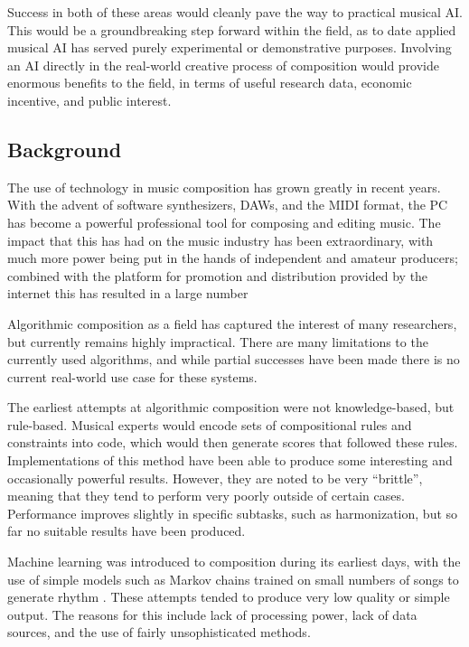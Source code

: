 \documentclass[11pt]{article}
\begin{document}
	Success in both of these areas would cleanly pave the way to practical musical AI. This would be a groundbreaking step forward within the field, as to date applied musical AI has served purely experimental or demonstrative purposes. Involving an AI directly in the real-world creative process of composition would provide enormous benefits to the field, in terms of useful research data, economic incentive, and public interest.
	
	\subsection{Background}
	
	The use of technology in music composition has grown greatly in recent years. With the advent of software synthesizers, DAWs, and the MIDI format, the PC has become a powerful professional tool for composing and editing music. The impact that this has had on the music industry has been extraordinary, with much more power being put in the hands of independent and amateur producers; combined with the platform for promotion and distribution provided by the internet this has resulted in a large number 
	
	
	Algorithmic composition as a field has captured the interest of many researchers, but currently remains highly impractical. There are many limitations to the currently used algorithms, and while partial successes have been made %
	there is no current real-world use case for these systems. 
	
	The earliest attempts at algorithmic composition were not knowledge-based, but rule-based. Musical experts would encode sets of compositional rules and constraints into code, which would then generate scores that followed these rules. Implementations of this method have been able to produce some interesting and occasionally powerful results. However, they are noted to be very ``brittle'', meaning that they tend to perform very poorly outside of certain cases. Performance improves slightly in specific subtasks, such as harmonization, but so far no suitable results have been produced.
	
	Machine learning was introduced to composition during its earliest days, with the use of simple models such as Markov chains trained on small numbers of songs to generate rhythm \cite[]{pinkerton1956information}. These attempts tended to produce very low quality or simple output. The reasons for this include lack of processing power, lack of data sources, and the use of fairly unsophisticated methods. 
	
\end{document}
